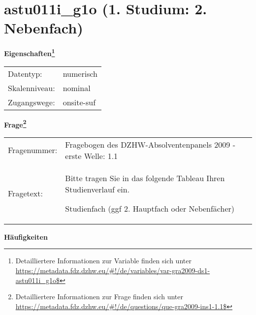 
    \setcounter{footnote}{0}

    \vspace*{-1.8cm}
	\section{astu011i\_g1o (1. Studium: 2. Nebenfach)}
	\label{section:astu011i_g1o}



    \vspace*{0.5cm}
    \noindent\textbf{Eigenschaften\footnote{Detailliertere Informationen zur Variable finden sich unter
		\url{https://metadata.fdz.dzhw.eu/\#!/de/variables/var-gra2009-ds1-astu011i_g1o$}}}\\
	\begin{tabularx}{\hsize}{@{}lX}
	Datentyp: & numerisch \\
	Skalenniveau: & nominal \\
	Zugangswege: &
	  onsite-suf
 \\
    \end{tabularx}



				\vspace*{0.5cm}
                \noindent\textbf{Frage\footnote{Detailliertere Informationen zur Frage finden sich unter
		              \url{https://metadata.fdz.dzhw.eu/\#!/de/questions/que-gra2009-ins1-1.1$}}}\\
				\begin{tabularx}{\hsize}{@{}lX}
					Fragenummer: &
					  Fragebogen des DZHW-Absolventenpanels 2009 - erste Welle:
					  1.1
 \\
					Fragetext: & Bitte tragen Sie in das folgende Tableau Ihren Studienverlauf ein.\par  Studienfach (ggf 2. Hauptfach oder Nebenfächer) \\
				\end{tabularx}





        		\vspace*{0.5cm}
                \noindent\textbf{Häufigkeiten}

